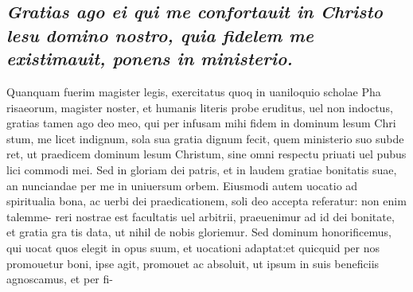\documentclass{article}
\begin{document}
\begin{pages}
\subsection*{\textit{Gratias ago ei qui me confortauit in Christo lesu domino nostro, quia fidelem me existimauit, ponens in ministerio. }}\pstart Quanquam fuerim magister legis, exercitatus quoq in uaniloquio scholae Pha risaeorum, magister noster, et humanis literis probe eruditus, uel non indoctus, gratias tamen ago deo meo, qui per infusam mihi fidem in dominum lesum Chri stum, me licet indignum, sola sua gratia dignum fecit, quem ministerio suo subde ret, ut praedicem dominum lesum Christum, sine omni respectu priuati uel pubus  lici commodi mei. Sed in gloriam dei patris, et in laudem gratiae bonitatis suae, an nunciandae per me in uniuersum orbem. Eiusmodi autem uocatio ad spiritualia bona, ac uerbi dei praedicationem, soli deo accepta referatur: non enim talemme- reri nostrae est facultatis uel arbitrii, praeuenimur ad id dei bonitate, et gratia gra tis data, ut nihil de nobis gloriemur. Sed dominum honorificemus, qui uocat quos elegit in opus suum, et uocationi adaptat:et quicquid per nos promouetur boni, ipse agit, promouet ac absoluit, ut ipsum in suis beneficiis agnoscamus, et per fi-  \pend

\end{pages}
\end{document}

